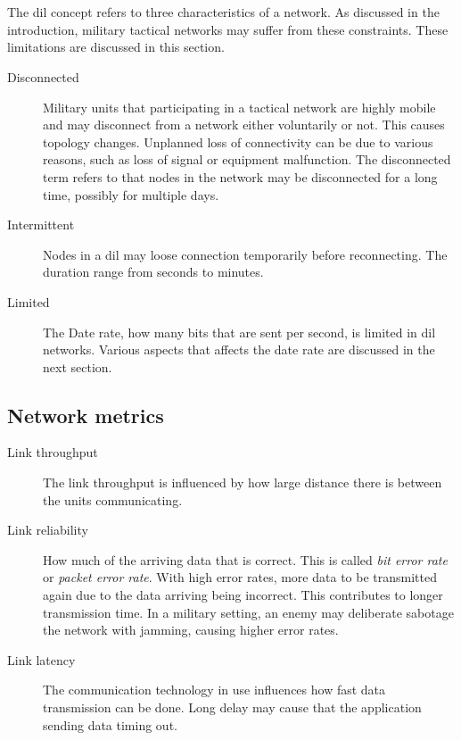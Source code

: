 \documentclass[USenglish]{ifimaster}
\begin{document}
\section{}
\label{dil}
The \gls{dil} concept refers to three characteristics of a network. As discussed
in the introduction, military tactical networks may suffer from these
constraints. These limitations are discussed in this section.

\begin{description}
\item[Disconnected]
Military units that participating in a tactical network are highly mobile
and may disconnect from a network either voluntarily or not. This causes
topology changes. Unplanned loss of connectivity can be due to various reasons,
such as loss of signal or equipment malfunction.  The disconnected term refers
to that nodes in the network may be disconnected for a long time, possibly for
multiple days.
\item[Intermittent]
Nodes in a \gls{dil} may loose connection temporarily before reconnecting. The
duration range from seconds to minutes.

\item[Limited] The Date rate, how many bits that are sent per second, is limited
in \gls{dil} networks. Various aspects that affects the date rate are discussed
in the next section.

\end{description}

\subsection{Network metrics}
\begin{description}

\item[Link throughput] The link throughput is influenced by how large distance
there is between the units communicating.

\item[Link reliability] How much of the arriving data that is correct. This is
called \textit{bit error rate} or \textit{packet error rate}. With high error
rates, more data to be transmitted again due to the data arriving being
incorrect. This contributes to longer transmission time. In a military setting,
an enemy may deliberate sabotage the network with jamming, causing higher error
rates.

\item[Link latency] The communication technology in use influences how fast data
transmission can be done. Long delay may cause that the application sending data
timing out.

\end{description}
\end{document}
